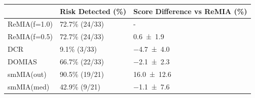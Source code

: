 \begin{tabular}{lll}
    \toprule
     & Risk Detected (\%) & Score Difference vs ReMIA (\%) \\
    \midrule
    ReMIA(f=1.0) & 72.7\% (24/33) & - \\
    ReMIA(f=0.5) & 72.7\% (24/33) & \num{0.6 +- 1.9} \\
    DCR & 9.1\% (3/33) & \num{-4.7 +- 4.0} \\
    DOMIAS & 66.7\% (22/33) & \num{-2.1 +- 2.3} \\
    smMIA(out) & 90.5\% (19/21) & \num{16.0 +- 12.6} \\
    smMIA(med) & 42.9\% (9/21) & \num{-1.1 +- 7.6} \\
    \bottomrule
\end{tabular}
